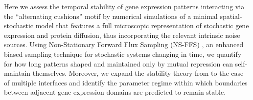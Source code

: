 \documentclass[a4paper,10pt]{article}
\begin{document}
Here we assess the temporal stability of gene expression patterns interacting via the ``alternating cushions'' motif by numerical simulations of a minimal spatial-stochastic model that features a full microscopic representation of stochastic gene expression and protein diffusion, thus incorporating the relevant intrinsic noise sources.
Using Non-Stationary Forward Flux Sampling (NS-FFS) \cite{BeckerTenWolde2012,BeckerAllenTenWolde2012}, an enhanced biased sampling technique for stochastic systems changing in time, we quantify for how long patterns shaped and maintained only by mutual repression can self-maintain themselves. Moreover, we expand the stability theory from \cite{Majka2023} to the case of multiple interfaces and identify the parameter regime within which boundaries between adjacent gene expression domains are predicted to remain stable.

\end{document}
